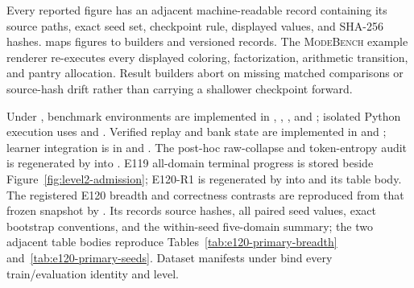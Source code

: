 \documentclass{article}
\newcommand{\1}{\mathbf 1}
\newcommand{\mb}{\textsc{ModeBench}}
\theoremstyle{remark}
\theoremstyle{definition}
\theoremstyle{plain}
\begin{document}
Every reported figure has an adjacent machine-readable record containing its
source paths, exact seed set, checkpoint rule, displayed values, and SHA-256
hashes.  maps figures to builders and versioned
records. The \mb{} example renderer re-executes every displayed coloring,
factorization, arithmetic transition, and pantry allocation. Result builders
abort on missing matched comparisons or source-hash drift rather than carrying a
shallower checkpoint forward.

Under , benchmark environments are implemented in
, , , and
; isolated Python execution uses
 and .
Verified replay and bank state are implemented in
 and ; learner
integration is in  and . The
post-hoc raw-collapse and token-entropy audit is regenerated by
 into
. E119 all-domain
terminal progress is stored beside Figure~\ref{fig:level2-admission}; E120-R1 is
regenerated by 
into  and its table body.
The registered E120 breadth and correctness contrasts are reproduced from
that frozen snapshot by
. Its
 records source hashes, all
paired seed values, exact bootstrap conventions, and the within-seed
five-domain summary; the two adjacent table bodies reproduce
Tables~\ref{tab:e120-primary-breadth} and~\ref{tab:e120-primary-seeds}.
Dataset manifests under  bind every train/evaluation identity
and level.
\end{document}

